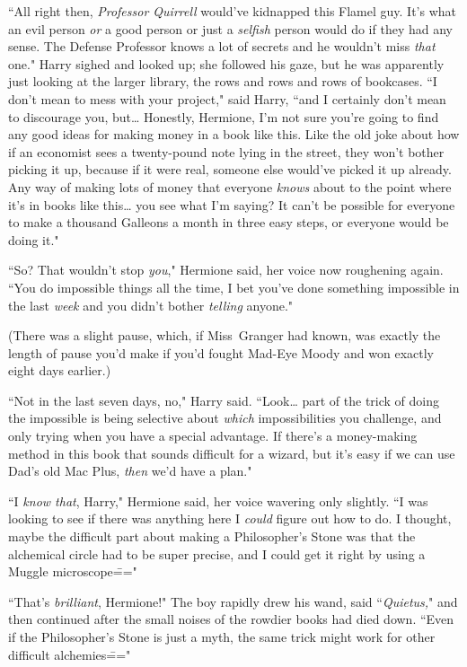``All right then, \emph{Professor Quirrell} would've kidnapped this Flamel guy. It's what an evil person \emph{or} a good person or just a \emph{selfish} person would do if they had any sense. The Defense Professor knows a lot of secrets and he wouldn't miss \emph{that} one." Harry sighed and looked up; she followed his gaze, but he was apparently just looking at the larger library, the rows and rows and rows of bookcases. ``I don't mean to mess with your project," said Harry, ``and I certainly don't mean to discourage you, but{\ldots} Honestly, Hermione, I'm not sure you're going to find any good ideas for making money in a book like this. Like the old joke about how if an economist sees a twenty-pound note lying in the street, they won't bother picking it up, because if it were real, someone else would've picked it up already. Any way of making lots of money that everyone \emph{knows} about to the point where it's in books like this{\ldots} you see what I'm saying? It can't be possible for everyone to make a thousand Galleons a month in three easy steps, or everyone would be doing it."

``So? That wouldn't stop \emph{you}," Hermione said, her voice now roughening again. ``You do impossible things all the time, I bet you've done something impossible in the last \emph{week} and you didn't bother \emph{telling} anyone."

(There was a slight pause, which, if Miss~Granger had known, was exactly the length of pause you'd make if you'd fought Mad-Eye Moody and won exactly eight days earlier.)

``Not in the last seven days, no," Harry said. ``Look{\ldots} part of the trick of doing the impossible is being selective about \emph{which} impossibilities you challenge, and only trying when you have a special advantage. If there's a money-making method in this book that sounds difficult for a wizard, but it's easy if we can use Dad's old Mac Plus, \emph{then} we'd have a plan."

``I \emph{know that}, Harry," Hermione said, her voice wavering only slightly. ``I was looking to see if there was anything here I \emph{could} figure out how to do. I thought, maybe the difficult part about making a Philosopher's Stone was that the alchemical circle had to be super precise, and I could get it right by using a Muggle microscope\==="

``That's \emph{brilliant}, Hermione!" The boy rapidly drew his wand, said ``\emph{Quietus,}" and then continued after the small noises of the rowdier books had died down. ``Even if the Philosopher's Stone is just a myth, the same trick might work for other difficult alchemies\==="

